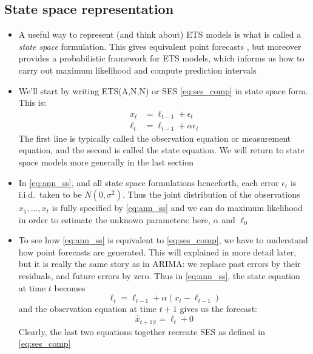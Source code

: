 \documentclass{article}
\begin{document}
\subsection{State space representation}

\begin{itemize}
\item A useful way to represent (and think about) ETS models is what is called
  a \emph{state space} formulation. This gives equivalent point forecasts 
  , but moreover provides a probabilistic framework 
  for ETS models, which informs us how to carry out maximum likelihood and
  compute prediction intervals

\item We'll start by writing ETS(A,N,N) or SES \eqref{eq:ses_comp} in state
  space form. This is:   
  \begin{equation}
  \label{eq:ann_ss}
  \begin{aligned}
  x_t &= \ell_{t-1} + \epsilon_t \\
  \ell_t &= \ell_{t-1} + \alpha \epsilon_t
  \end{aligned}
  \end{equation}
  The first line is typically called the observation equation or measurement
  equation, and the second is called the state equation. We will return to state
  space models more generally in the last section
  
\item In \eqref{eq:ann_ss}, and all state space formulations henceforth, each
  error $\epsilon_t$ is i.i.d.\ taken to be $N(0, \sigma^2)$. Thus the joint
  distribution of the observations $x_1,\dots,x_t$ is fully specified by
  \eqref{eq:ann_ss} and we can do maximum likelihood in order to estimate the
  unknown parameters: here, $\alpha$ and $\ell_0$ 

\item To see how \eqref{eq:ann_ss} is equivalent to \eqref{eq:ses_comp}, we have
  to understand how point forecasts are generated. This will explained in more 
  detail later, but it is really the same story as in ARIMA: we replace past
  errors by their residuals, and future errors by zero. Thus in
  \eqref{eq:ann_ss}, the state equation at time $t$ becomes     
  \[
  \ell_t = \ell_{t-1} + \alpha (x_t - \ell_{t-1})
  \]
  and the observation equation at time $t+1$ gives us the forecast:
  \[
  \hat{x}_{t+1 | t} = \ell_t + 0
  \]
  Clearly, the last two equations together recreate SES as defined in
  \eqref{eq:ses_comp}    


\end{itemize}
\end{document}
